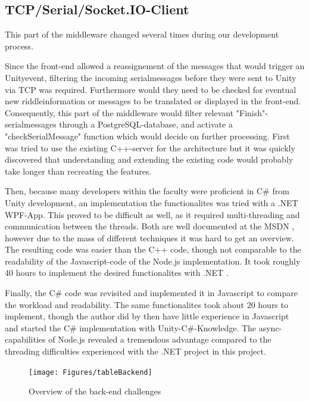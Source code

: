 \subsection{TCP/Serial/Socket.IO-Client}
This part of the middleware changed several times during our development process.

Since the front-end allowed a reassignement of the messages that would trigger an Unityevent, 
filtering the incoming serialmessages before they were sent to Unity via TCP was required.
Furthermore would they need to be checked for eventual new riddleinformation or messages to be translated or displayed in the front-end.
Consequently, this part of the middleware would filter relevant "Finish"-serialmessages through a PostgreSQL-database, 
and activate a "checkSerialMessage" function which would decide on further processing.
First was tried to use the existing C++-server for the architecture but it was quickly discovered that understanding and extending the existing code would probably take longer than recreating the features.

Then, because many developers within the faculty were proficient in C\# from Unity development, an implementation the functionalites was tried with a .NET WPF-App.
This proved to be difficult as well, as it required multi-threading and communication between the threads. 
Both are well documented at the MSDN \parencite{MSDN},
however due to the mass of different techniques it was hard to get an overview.
The resulting code was easier than the C++ code, though not comparable to the readability of the Javascript-code of the Node.js implementation.
It took roughly 40 hours to implement the desired functionalites with .NET .

Finally, the  C\# code was revisited and implemented it in Javascript to compare the workload and readability.
The same functionalites took about 20 hours to implement, though the author did by then have little experience in Javascript and started the C\# implementation with Unity-C\#-Knowledge.
The async-capabilities of Node.js revealed a tremendous advantage compared to the threading difficulties experienced with the .NET project in this project.


\begin{figure}[th]
	\centering
	\texttt{[image: Figures/tableBackend]}
	\decoRule
	\caption[PoC]{Overview of the back-end challenges}
	\label{fig:BackEndTable}
\end{figure}


